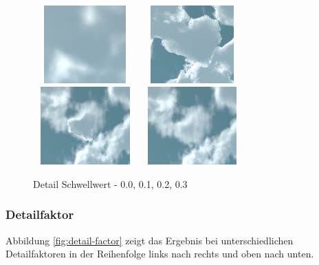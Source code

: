 \begin{figure}[H]
    \centering
    \includegraphics[width=4cm, height=3cm]{figures/detail-threshold/detail-threshold-0.0.png}
    \includegraphics[width=4cm, height=3cm]{figures/detail-threshold/detail-threshold-0.1.png}
    \includegraphics[width=4cm, height=3cm]{figures/detail-threshold/detail-threshold-0.2.png}
    \includegraphics[width=4cm, height=3cm]{figures/detail-threshold/detail-threshold-0.3.png}
    \caption{Detail Schwellwert - 0.0, 0.1, 0.2, 0.3}
    \label{fig:detail-threshold}
\end{figure}

\subsubsection{Detailfaktor}
Abbildung \ref{fig:detail-factor} zeigt das Ergebnis bei unterschiedlichen Detailfaktoren in der Reihenfolge links nach rechts und oben nach unten.

